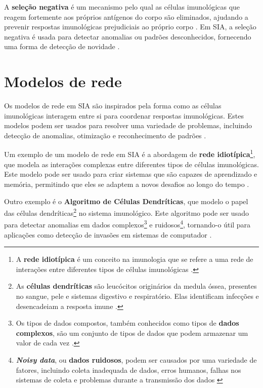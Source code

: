 A \textbf{seleção negativa} é um mecanismo pelo qual as células imunológicas que reagem fortemente aos próprios antígenos do corpo são eliminados, ajudando a prevenir respostas imunológicas prejudiciais ao próprio corpo \cite{greensmith2022}. Em SIA, a seleção negativa é usada para detectar anomalias ou padrões desconhecidos, fornecendo uma forma de detecção de novidade \cite{williams2024}.

\section{Modelos de rede}
\thispagestyle{mystyle}

Os modelos de rede em SIA são inspirados pela forma como as células imunológicas interagem entre si para coordenar respostas imunológicas. Estes modelos podem ser usados para resolver uma variedade de problemas, incluindo detecção de anomalias, otimização e reconhecimento de padrões \cite{greensmith2022}.

Um exemplo de um modelo de rede em SIA é a abordagem de \textbf{rede idiotípica}\footnote{A \textbf{rede idiotípica} é um conceito na imunologia que se refere a uma rede de interações entre diferentes tipos de células imunológicas \cite{Lemke2005}.}, que modela as interações complexas entre diferentes tipos de células imunológicas. Este modelo pode ser usado para criar sistemas que são capazes de aprendizado e memória, permitindo que eles se adaptem a novos desafios ao longo do tempo \cite{greensmith2022}.

Outro exemplo é o \textbf{Algoritmo de Células Dendríticas}, que modelo o papel das células dendríticas\footnote{As \textbf{células dendríticas} são leucócitos originários da medula óssea, presentes no sangue, pele e sistemas digestivo e respiratório. Elas identificam infecções e desencadeiam a resposta imune \cite{tuasaude2022}.} no sistema imunológico. Este algoritmo pode ser usado para detectar anomalias em dados complexos\footnote{Os tipos de dados compostos, também conhecidos como tipos de \textbf{dados complexos}, são um conjunto de tipos de dados que podem armazenar um valor de cada vez \cite{cursa2024}.} e ruidosos\footnote{\textbf{\textit{Noisy data}}, ou \textbf{dados ruidosos}, podem ser causados por uma variedade de fatores, incluindo coleta inadequada de dados, erros humanos, falhas nos sistemas de coleta e problemas durante a transmissão dos dados \cite{maiconramos2024}}, tornando-o útil para aplicações como detecção de invasões em sistemas de computador \cite{greensmith2022}.

